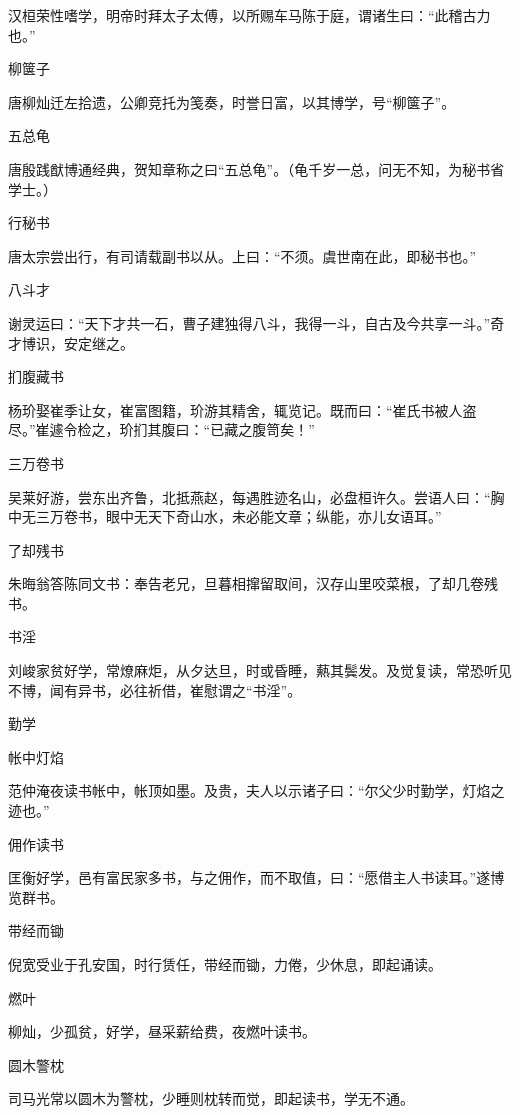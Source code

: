 \documentclass[a4paper,12pt,UTF8,twoside]{ctexbook}
\begin{document}
    汉桓荣性嗜学，明帝时拜太子太傅，以所赐车马陈于庭，谓诸生曰：“此稽古力也。”
    
    柳箧子
    
    唐柳灿迁左拾遗，公卿竞托为笺奏，时誉日富，以其博学，号“柳箧子”。
    
    五总龟
    
    唐殷践猷博通经典，贺知章称之曰“五总龟”。（龟千岁一总，问无不知，为秘书省学士。）
    
    行秘书
    
    唐太宗尝出行，有司请载副书以从。上曰：“不须。虞世南在此，即秘书也。”
    
    八斗才
    
    谢灵运曰：“天下才共一石，曹子建独得八斗，我得一斗，自古及今共享一斗。”奇才博识，安定继之。
    
    扪腹藏书
    
    杨玠娶崔季让女，崔富图籍，玠游其精舍，辄览记。既而曰：“崔氏书被人盗尽。”崔遽令检之，玠扪其腹曰：“已藏之腹笥矣！”
    
    三万卷书
    
    吴莱好游，尝东出齐鲁，北抵燕赵，每遇胜迹名山，必盘桓许久。尝语人曰：“胸中无三万卷书，眼中无天下奇山水，未必能文章；纵能，亦儿女语耳。”
    
    了却残书
    
    朱晦翁答陈同文书：奉告老兄，旦暮相撺留取间，汉存山里咬菜根，了却几卷残书。
    
    书淫
    
    刘峻家贫好学，常燎麻炬，从夕达旦，时或昏睡，爇其鬓发。及觉复读，常恐听见不博，闻有异书，必往祈借，崔慰谓之“书淫”。
    
    勤学
    
    帐中灯焰
    
    范仲淹夜读书帐中，帐顶如墨。及贵，夫人以示诸子曰：“尔父少时勤学，灯焰之迹也。”
    
    佣作读书
    
    匡衡好学，邑有富民家多书，与之佣作，而不取值，曰：“愿借主人书读耳。”遂博览群书。
    
    带经而锄
    
    倪宽受业于孔安国，时行赁任，带经而锄，力倦，少休息，即起诵读。
    
    燃叶
    
    柳灿，少孤贫，好学，昼采薪给费，夜燃叶读书。
    
    圆木警枕
    
    司马光常以圆木为警枕，少睡则枕转而觉，即起读书，学无不通。
    
\end{document}
